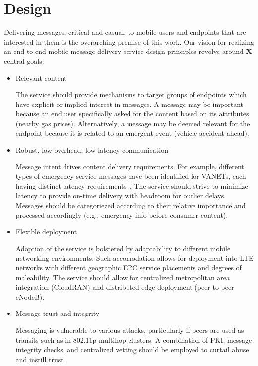 \section*{Design}

Delivering messages, critical and casual, to mobile users and
endpoints that are interested in them is the overarching premise of
this work. Our vision for realizing an end-to-end mobile message
delivery service design principles revolve around {\bf X} central
goals:

\begin{itemize}
\item Relevant content

The service should provide mechanisms to target groups of endpoints
which have explicit or implied interest in messages. A message may be
important because an end user specifically asked for the content based
on its attributes (nearby gas prices). Alternatively, a message may be
deemed relevant for the endpoint because it is related to an emergent
event (vehicle accident ahead).

\item Robust, low overhead, low latency communication

Message intent drives content delivery requirements.  For example,
different types of emergency service messages have been identified for
VANETs, each having distinct latency
requirements~\cite{vanet-msg-reqs}. The service should strive to
minimize latency to provide on-time delivery with headroom for outlier
delays. Messages should be categoriezed according to their relative
importance and processed accordingly (e.g., emergency info before
consumer content).

\item Flexible deployment

Adoption of the service is bolstered by adaptability to different
mobile networking environments.  Such accomodation allows for
deployment into LTE networks with different geographic EPC service
placements and degrees of maleability.  The service should allow for
centralized metropolitan area integration (CloudRAN) and distributed
edge deployment (peer-to-peer eNodeB).

\item Message trust and integrity

Messaging is vulnerable to various attacks, particularly if peers are
used as transits such as in 802.11p multihop clusters. A combination
of PKI, message integrity checks, and centralized vetting should be
employed to curtail abuse and instill trust.


\end{itemize}
